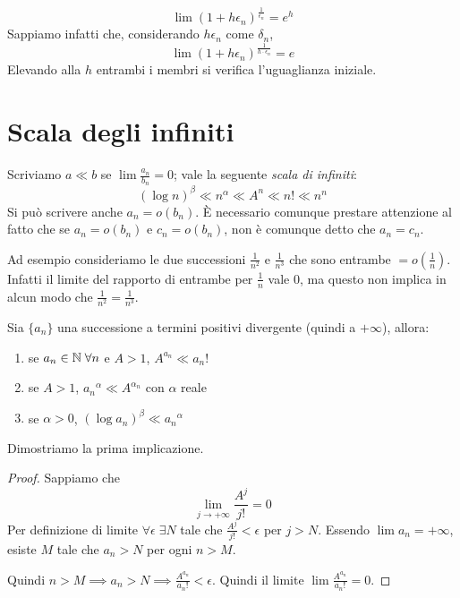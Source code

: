 \begin{remark}
\begin{equation*}
\lim (1+h\epsilon_n)^\frac{1}{\epsilon_n} = e^h
\end{equation*}
Sappiamo infatti che, considerando $h\epsilon_n$ come $\delta_n$, 
\begin{equation*}
\lim (1+h\epsilon_n)^\frac{1}{h\cdot\epsilon_n} = e
\end{equation*}
Elevando alla $h$ entrambi i membri si verifica l'uguaglianza iniziale.
\end{remark}

\section{Scala degli infiniti}
Scriviamo $a \ll b$ se $\lim \frac{a_n}{b_n} = 0$; vale la seguente \emph{scala di infiniti}:
\begin{equation*}
(\log n)^\beta \ll n^\alpha \ll A^n \ll n! \ll n^n
\end{equation*}
Si può scrivere anche $a_n = o(b_n)$. È necessario comunque prestare attenzione al fatto che se $a_n = o(b_n)$ e $c_n = o(b_n)$, non è comunque detto che $a_n = c_n$. 

Ad esempio consideriamo le due successioni $\frac{1}{n^2}$ e $\frac{1}{n^3}$ che sono entrambe $=o(\frac{1}{n})$. Infatti il limite del rapporto di entrambe per $\frac{1}{n}$ vale 0, ma questo non implica in alcun modo che $\frac{1}{n^2} = \frac{1}{n^3}$.

\begin{proposition}
Sia $\{a_n\}$ una successione a termini positivi divergente (quindi a $+\infty$), allora:
\begin{enumerate}
\item se $a_n \in \mathbb N \; \forall n$ e $A > 1$, $A^{a_n} \ll a_n!$
\item se $A > 1$, ${a_n}^\alpha \ll A^{\alpha_n}$ con $\alpha$ reale
\item se $\alpha > 0$, $(\log a_n)^\beta \ll {a_n}^\alpha$
\end{enumerate}
\end{proposition}

Dimostriamo la prima implicazione.

\begin{proof}
Sappiamo che
\begin{equation*}
\lim_{j \to +\infty} \frac{A^j}{j!} = 0
\end{equation*}
Per definizione di limite $\forall \epsilon \; \exists N$ tale che $\frac{A^j}{j!} < \epsilon$ per $j > N$. Essendo $\lim a_n = +\infty$, esiste $M$ tale che $a_n > N$ per ogni $n > M$.

Quindi $n > M \implies a_n > N \implies \frac{A^{a_n}}{a_n!} < \epsilon$. Quindi il limite $\lim \frac{A^{a_n}}{a_n!} = 0$.
\end{proof}

